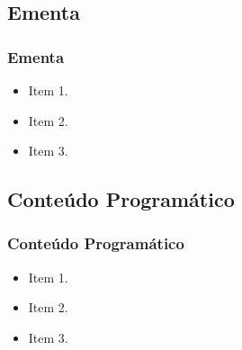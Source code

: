 \subsection[Ementa]{Ementa}\label{subsec:sec02-ementa}



\begin{frame}[t]\frametitle{Ementa}

  \begin{itemize}
    \justifying{}
    \setlength\itemsep{1em}
    \item Item 1.
    \item Item 2.
    \item Item 3.
  \end{itemize}

\end{frame}



\subsection[Conteúdo Programático]{Conteúdo Programático}\label{subsec:sec02-conteudo-programatico}



\begin{frame}[t]\frametitle{Conteúdo Programático}

  \begin{itemize}
    \justifying{}
    \setlength\itemsep{1em}
    \item Item 1.
    \item Item 2.
    \item Item 3.
  \end{itemize}

\end{frame}



